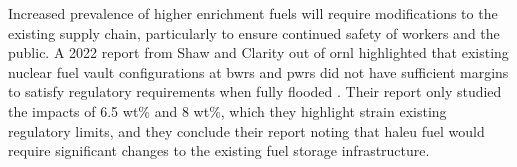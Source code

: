 Increased prevalence of higher enrichment fuels will require modifications to the existing supply chain, particularly to ensure continued safety of workers and the public. A 2022 report from Shaw and Clarity out of \gls{ornl} highlighted that existing nuclear fuel vault configurations at \glspl{bwr} and \glspl{pwr} did not have sufficient margins to satisfy regulatory requirements when fully flooded \cite{leup_atf_storage_impacts}. Their report only studied the impacts of 6.5 wt$\%$ and 8 wt$\%$, which they highlight strain existing regulatory limits, and they conclude their report noting that \gls{haleu} fuel would require significant changes to the existing fuel storage infrastructure.